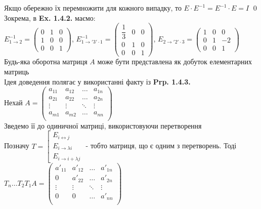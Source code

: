 \documentclass[a4paper, 10pt]{article}
\theoremstyle{theoremdd}
\begin{document}
	Якщо обережно їх перемножити для кожного випадку, то $E \cdot E^{-1} = E^{-1} \cdot E = I$ \qed
	\bigskip \\
	Зокрема, в \textbf{Ex. 1.4.2.} маємо:\\
	$E_{1 \rightarrow 2}^{-1} = \begin{pmatrix}
	0 & 1 & 0 \\
	1 & 0 & 0 \\
	0 & 0 & 1
	\end{pmatrix}$, $E_{1 \rightarrow '3' \cdot 1}^{-1} = \begin{pmatrix}
	\dfrac{1}{3} & 0 & 0 \\
	0 & 1 & 0 \\
	0 & 0 & 1
	\end{pmatrix}$, $E_{2 \rightarrow '2'\cdot 3} = \begin{pmatrix}
	1 & 0 & 0 \\
	0 & 1 & -2 \\
	0 & 0 & 1
	\end{pmatrix}$
	\bigskip \\
	 Будь-яка оборотна матриця $A$ може бути представлена як добуток елементарних матриць\\
	\proof
	Ідея доведення полягає у використанні факту із \textbf{Prp. 1.4.3.}\\
	Нехай
	$A = \begin{pmatrix}
	a_{11} & a_{12} & \dots & a_{1n} \\
	a_{21} & a_{22} & \dots & a_{2n} \\
	\vdots & \vdots & \ddots & \vdots \\
	a_{m1} & a_{m2} & \dots & a_{nn} \\
	\end{pmatrix}$ \\ Зведемо її до одиничної матриці, використовуючи перетворення\\
	Позначу $T = \left[ \begin{gathered} E_{i \leftrightarrow j} \\ E_{i \rightarrow \lambda i} \\ E_{i \rightarrow i + \lambda j} \end{gathered} \right.$ - тобто матриця, що є одним з перетворень. Тоді\\
	$T_n \dots T_2 T_1 A = \begin{pmatrix}
	a'_{11} & a'_{12} & \dots & a'_{1n} \\
	0 & a'_{22} & \dots & a'_{2n} \\
	\vdots & \vdots & \ddots & \vdots \\
	0 & 0 & \dots & a'_{nn} \\
	\end{pmatrix}$\\
\end{document}
